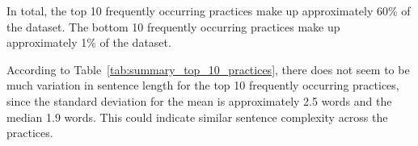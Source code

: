 	\begin{table}[!ht]
	\caption{Summary statistics for bottom 10 frequently occurring practices.}
	\label{tab:bottom_10_sentence}
\end{table}

In total, the top 10 frequently occurring practices make up approximately 60\% of the dataset. The bottom 10 frequently occurring practices make up approximately 1\% of the dataset.

According to Table~\ref{tab:summary_top_10_practices}, there does not seem to be much variation in sentence length for the top 10 frequently occurring practices, since the standard deviation for the mean is approximately 2.5 words and the median 1.9 words. This could indicate similar sentence complexity across the practices.

